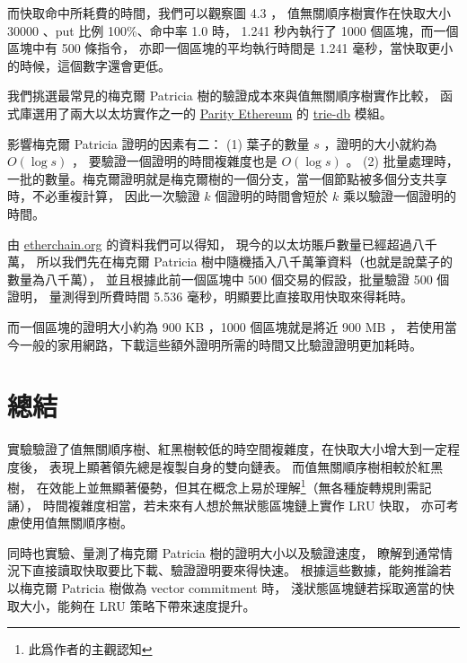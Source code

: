 而快取命中所耗費的時間，我們可以觀察圖 4.3 ，
值無關順序樹實作在快取大小 30000 、put 比例 100\%、命中率 1.0 時，
 1.241 秒內執行了 1000 個區塊，而一個區塊中有 500 條指令，
亦即一個區塊的平均執行時間是 1.241 毫秒，當快取更小的時候，這個數字還會更低。

我們挑選最常見的梅克爾 Patricia 樹的驗證成本來與值無關順序樹實作比較，
函式庫選用了兩大以太坊實作之一的 \href{https://www.parity.io/ethereum/}{Parity Ethereum}
的 \href{https://docs.rs/trie-db/0.20.1/trie_db/index.html}{trie-db} 模組。

影響梅克爾 Patricia 證明的因素有二：
(1) 葉子的數量 $s$ ，證明的大小就約為 $O(\log s)$ ， 要驗證一個證明的時間複雜度也是 $O(\log s)$ 。
(2) 批量處理時，一批的數量。梅克爾證明就是梅克爾樹的一個分支，當一個節點被多個分支共享時，不必重複計算，
因此一次驗證 $k$ 個證明的時間會短於 $k$ 乘以驗證一個證明的時間。

由 \href{https://www.etherchain.org/charts/totalAccounts}{etherchain.org} 的資料我們可以得知，
現今的以太坊賬戶數量已經超過八千萬，
所以我們先在梅克爾 Patricia 樹中隨機插入八千萬筆資料（也就是說葉子的數量為八千萬），
並且根據此前一個區塊中 500 個交易的假設，批量驗證 500 個證明，
量測得到所費時間 5.536 毫秒，明顯要比直接取用快取來得耗時。

而一個區塊的證明大小約為 900 KB ，1000 個區塊就是將近 900 MB ，
若使用當今一般的家用網路，下載這些額外證明所需的時間又比驗證證明更加耗時。

\section{總結}

實驗驗證了值無關順序樹、紅黑樹較低的時空間複雜度，在快取大小增大到一定程度後，
表現上顯著領先總是複製自身的雙向鏈表。 而值無關順序樹相較於紅黑樹，
在效能上並無顯著優勢，但其在概念上易於理解\footnote{此爲作者的主觀認知}（無各種旋轉規則需記誦），
時間複雜度相當，若未來有人想於無狀態區塊鏈上實作 LRU 快取，
亦可考慮使用值無關順序樹。

同時也實驗、量測了梅克爾 Patricia 樹的證明大小以及驗證速度，
瞭解到通常情況下直接讀取快取要比下載、驗證證明要來得快速。
根據這些數據，能夠推論若以梅克爾 Patricia 樹做為 vector commitment 時，
淺狀態區塊鏈若採取適當的快取大小，能夠在 LRU 策略下帶來速度提升。
